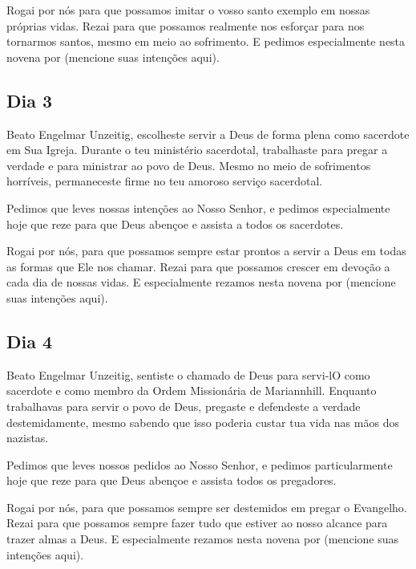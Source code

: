 \documentclass[a4paper,14pt]{extarticle} \usepackage[utf8]{inputenc}
\begin{document}
Rogai por nós para que possamos imitar o vosso santo exemplo em nossas próprias vidas. Rezai para que possamos realmente nos esforçar para nos tornarmos santos, mesmo em meio ao sofrimento. E pedimos especialmente nesta novena por (mencione suas intenções aqui).


\underline{}

\subsection{Dia 3}

\underline{}

Beato Engelmar Unzeitig, escolheste servir a Deus de forma plena como sacerdote em Sua Igreja. Durante o teu ministério sacerdotal, trabalhaste para pregar a verdade e para ministrar ao povo de Deus. Mesmo no meio de sofrimentos horríveis, permaneceste firme no teu amoroso serviço sacerdotal.

Pedimos que leves nossas intenções ao Nosso Senhor, e pedimos especialmente hoje que reze para que Deus abençoe e assista a todos os sacerdotes. 

Rogai por nós, para que possamos sempre estar prontos a servir a Deus em todas as formas que Ele nos chamar. Rezai para que possamos crescer em devoção a cada dia de nossas vidas. E especialmente rezamos nesta novena por (mencione suas intenções aqui).


\underline{}

\subsection{Dia 4}

\underline{}

Beato Engelmar Unzeitig, sentiste o chamado de Deus para servi-lO como sacerdote e como membro da Ordem Missionária de Mariannhill.
Enquanto trabalhavas para servir o povo de Deus,
 pregaste e defendeste a verdade destemidamente,
 mesmo sabendo que isso poderia custar tua vida nas mãos dos nazistas.

Pedimos que leves nossos pedidos ao Nosso Senhor, e pedimos particularmente hoje que reze para que Deus abençoe e assista todos os pregadores. 

Rogai por nós, para que possamos sempre ser destemidos em pregar o Evangelho. Rezai para que possamos sempre fazer tudo que estiver ao nosso alcance para trazer almas a Deus. E especialmente rezamos nesta novena por (mencione suas intenções aqui).
\end{document}
